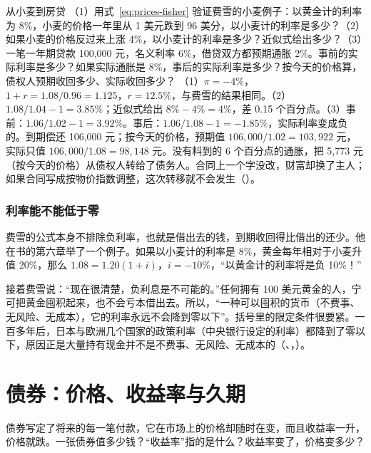 \begin{example}{从小麦到房贷}\label{ex:prices-fisher}
（1）用式~\eqref{eq:prices-fisher} 验证费雪的小麦例子：以黄金计的利率为 8\%，小麦的价格一年里从 1 美元跌到 96 美分，以小麦计的利率是多少？（2）如果小麦的价格反过来上涨 4\%，以小麦计的利率是多少？近似式给出多少？（3）一笔一年期贷款 100,000 元，名义利率 6\%，借贷双方都预期通胀 2\%。事前的实际利率是多少？如果实际通胀是 8\%，事后的实际利率是多少？按今天的价格算，债权人预期收回多少、实际收回多少？
\solution （1）$\pi=-4\%$，$1+r=1.08/0.96=1.125$，$r=12.5\%$，与费雪的结果相同。（2）$1.08/1.04-1=3.85\%$；近似式给出 $8\%-4\%=4\%$，差 0.15 个百分点。（3）事前：$1.06/1.02-1=3.92\%$。事后：$1.06/1.08-1=-1.85\%$，实际利率变成负的。到期偿还 106,000 元；按今天的价格，预期值 $106{,}000/1.02=103{,}922$ 元，实际只值 $106{,}000/1.08=98{,}148$ 元。没有料到的 6 个百分点的通胀，把 5,773 元（按今天的价格）从债权人转给了债务人。合同上一个字没改，财富却换了主人；如果合同写成按物价指数调整，这次转移就不会发生（）。
\end{example}

\subsubsection{利率能不能低于零}
费雪的公式本身不排除负利率，也就是借出去的钱，到期收回得比借出的还少。他在书的第六章举了一个例子。如果以小麦计的利率是 8\%，黄金每年相对于小麦升值 20\%，那么 $1.08=1.20(1+i)$，$i=-10\%$，“以黄金计的利率将是负 10\%！”

接着费雪说：“现在很清楚，负利息是不可能的。”任何拥有 100 美元黄金的人，宁可把黄金囤积起来，也不会亏本借出去。所以，“一种可以囤积的货币（不费事、无风险、无成本），它的利率永远不会降到零以下”\cite{fisher1896}。括号里的限定条件很要紧。一百多年后，日本与欧洲几个国家的政策利率（中央银行设定的利率）都降到了零以下，原因正是大量持有现金并不是不费事、无风险、无成本的（、，）。

\section{债券：价格、收益率与久期}\label{sec:prices-bonds}

债券写定了将来的每一笔付款，它在市场上的价格却随时在变，而且收益率一升，价格就跌。一张债券值多少钱？“收益率”指的是什么？收益率变了，价格变多少？

